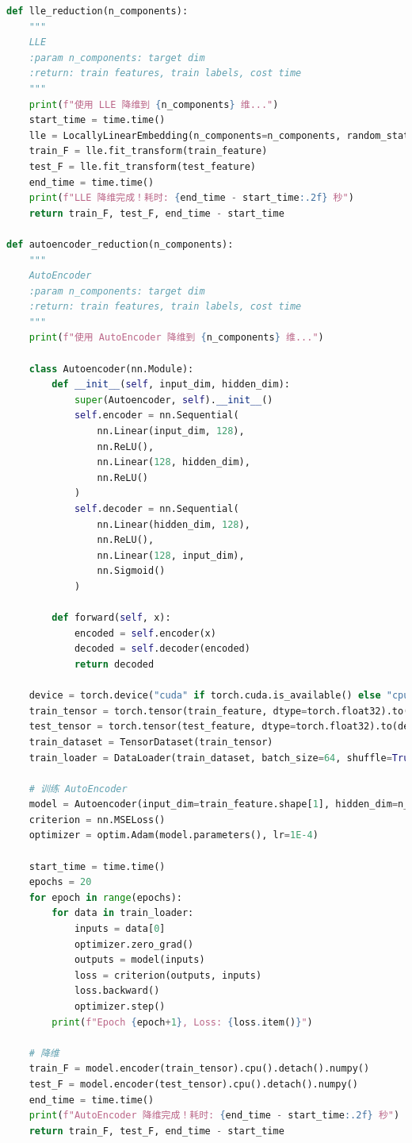 \documentclass[lang=cn]{elegantpaper}
\begin{document}
\begin{lstlisting}[language=Python]
def lle_reduction(n_components):
    """
    LLE
    :param n_components: target dim
    :return: train features, train labels, cost time
    """
    print(f"使用 LLE 降维到 {n_components} 维...")
    start_time = time.time()
    lle = LocallyLinearEmbedding(n_components=n_components, random_state=random_state)
    train_F = lle.fit_transform(train_feature)
    test_F = lle.fit_transform(test_feature)
    end_time = time.time()
    print(f"LLE 降维完成！耗时: {end_time - start_time:.2f} 秒")
    return train_F, test_F, end_time - start_time

def autoencoder_reduction(n_components):
    """
    AutoEncoder
    :param n_components: target dim
    :return: train features, train labels, cost time
    """
    print(f"使用 AutoEncoder 降维到 {n_components} 维...")

    class Autoencoder(nn.Module):
        def __init__(self, input_dim, hidden_dim):
            super(Autoencoder, self).__init__()
            self.encoder = nn.Sequential(
                nn.Linear(input_dim, 128),
                nn.ReLU(),
                nn.Linear(128, hidden_dim),
                nn.ReLU()
            )
            self.decoder = nn.Sequential(
                nn.Linear(hidden_dim, 128),
                nn.ReLU(),
                nn.Linear(128, input_dim),
                nn.Sigmoid()
            )
        
        def forward(self, x):
            encoded = self.encoder(x)
            decoded = self.decoder(encoded)
            return decoded

    device = torch.device("cuda" if torch.cuda.is_available() else "cpu")
    train_tensor = torch.tensor(train_feature, dtype=torch.float32).to(device)
    test_tensor = torch.tensor(test_feature, dtype=torch.float32).to(device)
    train_dataset = TensorDataset(train_tensor)
    train_loader = DataLoader(train_dataset, batch_size=64, shuffle=True)

    # 训练 AutoEncoder
    model = Autoencoder(input_dim=train_feature.shape[1], hidden_dim=n_components).to(device)
    criterion = nn.MSELoss()
    optimizer = optim.Adam(model.parameters(), lr=1E-4)

    start_time = time.time()
    epochs = 20
    for epoch in range(epochs):
        for data in train_loader:
            inputs = data[0]
            optimizer.zero_grad()
            outputs = model(inputs)
            loss = criterion(outputs, inputs)
            loss.backward()
            optimizer.step()
        print(f"Epoch {epoch+1}, Loss: {loss.item()}")

    # 降维
    train_F = model.encoder(train_tensor).cpu().detach().numpy()
    test_F = model.encoder(test_tensor).cpu().detach().numpy()
    end_time = time.time()
    print(f"AutoEncoder 降维完成！耗时: {end_time - start_time:.2f} 秒")
    return train_F, test_F, end_time - start_time
\end{lstlisting}
\end{document}
